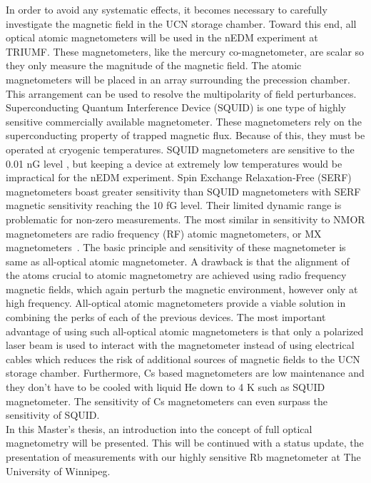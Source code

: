 In order to avoid any systematic effects, it becomes necessary to carefully investigate the magnetic field in the UCN storage chamber.  Toward this end, all optical atomic magnetometers will be used in the nEDM experiment at TRIUMF.  These magnetometers, like the mercury co-magnetometer, are scalar so they only measure the magnitude of the magnetic field.  The atomic  magnetometers will be placed in an array surrounding the precession chamber. This arrangement can be used to resolve the multipolarity of field perturbances. Superconducting Quantum Interference Device (SQUID) is one type of highly sensitive commercially available  magnetometer. These magnetometers rely on the superconducting property of trapped magnetic flux. Because of this, they must be operated at cryogenic temperatures. SQUID magnetometers are sensitive to the 0.01 nG level \cite{doi:10.1063/1.3491215}, but keeping a device at extremely low temperatures would be impractical for the nEDM experiment. Spin Exchange Relaxation-Free (SERF) magnetometers boast greater sensitivity than SQUID magnetometers with SERF magnetic sensitivity reaching the 10 fG level\cite{doi:10.1063/1.3491215}. Their limited dynamic range is problematic for non-zero measurements. The most similar in sensitivity to NMOR magnetometers are radio frequency (RF) atomic magnetometers, or MX magnetometers~\cite{Groeger2006}. The basic principle and sensitivity of these magnetometer is same as all-optical atomic magnetometer. A drawback is that the alignment of the atoms crucial to atomic magnetometry are achieved using radio frequency magnetic fields, which again perturb the magnetic
environment, however only at high frequency.  All-optical atomic magnetometers provide a viable solution in combining the perks of each of the previous devices. The most important advantage of using such all-optical atomic magnetometers is that only a polarized laser beam is used to interact with the magnetometer instead of using electrical cables which reduces the risk of additional sources of magnetic fields to the UCN storage chamber. Furthermore, Cs based magnetometers are low  maintenance and they don't have to be cooled with liquid He down to 4 K such as SQUID magnetometer.  The sensitivity of Cs magnetometers can even surpass the sensitivity of SQUID. \\
In this Master's thesis, an introduction into the concept of full optical magnetometry will be presented. This will be continued with a status update, the presentation of measurements with our highly sensitive Rb magnetometer at The University of Winnipeg. 

